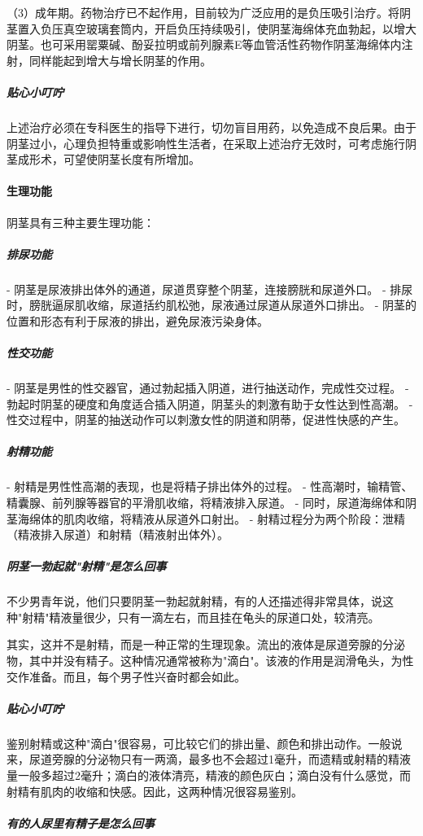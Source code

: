 （3）成年期。药物治疗已不起作用，目前较为广泛应用的是负压吸引治疗。将阴茎置入负压真空玻璃套筒内，开启负压持续吸引，使阴茎海绵体充血勃起，以增大阴茎。也可采用罂粟碱、酚妥拉明或前列腺素E等血管活性药物作阴茎海绵体内注射，同样能起到增大与增长阴茎的作用。

\subparagraph{贴心小叮咛}

上述治疗必须在专科医生的指导下进行，切勿盲目用药，以免造成不良后果。由于阴茎过小，心理负担特重或影响性生活者，在采取上述治疗无效时，可考虑施行阴茎成形术，可望使阴茎长度有所增加。

\paragraph{生理功能}

阴茎具有三种主要生理功能：

\subparagraph{排尿功能}
- 阴茎是尿液排出体外的通道，尿道贯穿整个阴茎，连接膀胱和尿道外口。
- 排尿时，膀胱逼尿肌收缩，尿道括约肌松弛，尿液通过尿道从尿道外口排出。
- 阴茎的位置和形态有利于尿液的排出，避免尿液污染身体。

\subparagraph{性交功能}
- 阴茎是男性的性交器官，通过勃起插入阴道，进行抽送动作，完成性交过程。
- 勃起时阴茎的硬度和角度适合插入阴道，阴茎头的刺激有助于女性达到性高潮。
- 性交过程中，阴茎的抽送动作可以刺激女性的阴道和阴蒂，促进性快感的产生。

\subparagraph{射精功能}
- 射精是男性性高潮的表现，也是将精子排出体外的过程。
- 性高潮时，输精管、精囊腺、前列腺等器官的平滑肌收缩，将精液排入尿道。
- 同时，尿道海绵体和阴茎海绵体的肌肉收缩，将精液从尿道外口射出。
- 射精过程分为两个阶段：泄精（精液排入尿道）和射精（精液射出体外）。

\subparagraph{阴茎一勃起就"射精"是怎么回事}

不少男青年说，他们只要阴茎一勃起就射精，有的人还描述得非常具体，说这种"射精"精液量很少，只有一滴左右，而且挂在龟头的尿道口处，较清亮。

其实，这并不是射精，而是一种正常的生理现象。流出的液体是尿道旁腺的分泌物，其中并没有精子。这种情况通常被称为"滴白"。该液的作用是润滑龟头，为性交作准备。而且，每个男子性兴奋时都会如此。

\subparagraph{贴心小叮咛}

鉴别射精或这种"滴白"很容易，可比较它们的排出量、颜色和排出动作。一般说来，尿道旁腺的分泌物只有一两滴，最多也不会超过1毫升，而遗精或射精的精液量一般多超过2毫升；滴白的液体清亮，精液的颜色灰白；滴白没有什么感觉，而射精有肌肉的收缩和快感。因此，这两种情况很容易鉴别。

\subparagraph{有的人尿里有精子是怎么回事}

